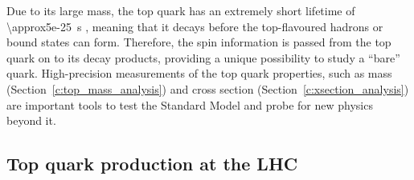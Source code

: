 Due to its large mass, the top quark has an extremely short lifetime of \SI{\approx5e-25}{\s} \autocite{PDG}, meaning
that it decays before the top-flavoured hadrons or \ttbar bound states can form. Therefore, the spin information is
passed from the top quark on to its decay products, providing a unique possibility to study a ``bare'' quark.
High-precision measurements of the top quark properties, such as mass (Section~\ref{c:top_mass_analysis}) and cross
section (Section~\ref{c:xsection_analysis}) are important tools to test the Standard Model and probe for new physics
beyond it.

\subsection{Top quark production at the LHC}
\label{ss:top_production}

